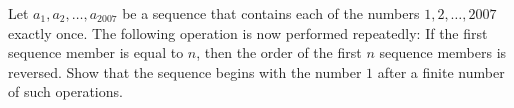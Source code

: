 Let $a_1,a_2,\ldots, a_{2007}$ be a sequence that contains each of the numbers $1,2,\ldots,2007$
exactly once. The following operation is now performed repeatedly:
If the first sequence member is equal to $n$, then the order of the first $n$ sequence
members is reversed.
Show that the sequence begins with the number $1$ after a finite number of such operations.